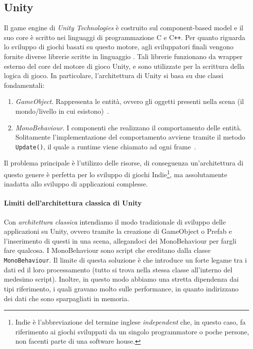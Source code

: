 \subsection{Unity}
Il game engine di \emph{Unity Technologies} è costruito sul component-based model e il suo core è scritto nei linguaggi di programmazione C e C\texttt{++}. Per quanto riguarda lo sviluppo di giochi basati su questo motore, agli sviluppatori finali vengono fornite diverse librerie scritte in linguaggio \Csh. Tali librerie funzionano da wrapper esterno del core del motore di gioco Unity, e sono utilizzate per la scrittura della logica di gioco. In particolare, l'architettura di Unity si basa su due classi fondamentali: 

\begin{enumerate}
    \item \emph{GameObject}. Rappresenta le entità, ovvero gli oggetti presenti nella scena (il mondo/livello in cui esistono)~\cite{doc:unity-gameobjects}.
    \item \emph{MonoBehaviour}. I componenti che realizzano il comportamento delle entità. Solitamente l'implementazione del comportamento avviene tramite il metodo \verb|Update()|, il quale a runtime viene chiamato ad ogni frame~\cite{doc:unity-monobehaviour}.
\end{enumerate}

Il problema principale è l'utilizzo delle risorse, di conseguenza un'architettura di questo genere è perfetta per lo sviluppo di giochi Indie\footnote{Indie è l'abbreviazione del termine inglese \emph{independent} che, in questo caso, fa riferimento ai giochi sviluppati da un singolo programmatore o poche persone, non facenti parte di una software house.}, ma assolutamente inadatta allo sviluppo di applicazioni complesse.

\paragraph{Limiti dell'architettura classica di Unity}
Con \emph{architettura classica} intendiamo il modo tradizionale di sviluppo delle applicazioni su Unity, ovvero tramite la creazione di GameObject o Prefab e l'inserimento di questi in una scena, allegandoci dei MonoBehaviour per fargli fare qualcosa. I MonoBehaviour sono script che ereditano dalla classe \verb|MonoBehaviour|. Il limite di questa soluzione è che introduce un forte legame tra i dati ed il loro processamento (tutto si trova nella stessa classe all'interno del medesimo script). Inoltre, in questo modo abbiamo una stretta dipendenza dai tipi riferimento, i quali gravano molto sulle performance, in quanto indirizzano dei dati che sono sparpagliati in memoria.

